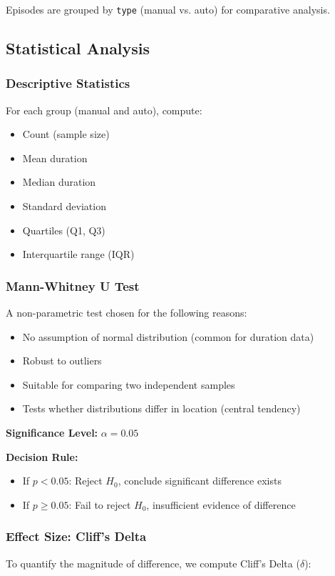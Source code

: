 \documentclass[12pt,a4paper]{article}
\begin{document}
Episodes are grouped by \texttt{type} (manual vs. auto) for comparative analysis.

\subsection{Statistical Analysis}

\subsubsection{Descriptive Statistics}
For each group (manual and auto), compute:
\begin{itemize}
    \item Count (sample size)
    \item Mean duration
    \item Median duration
    \item Standard deviation
    \item Quartiles (Q1, Q3)
    \item Interquartile range (IQR)
\end{itemize}

\subsubsection{Mann-Whitney U Test}
A non-parametric test chosen for the following reasons:
\begin{itemize}
    \item No assumption of normal distribution (common for duration data)
    \item Robust to outliers
    \item Suitable for comparing two independent samples
    \item Tests whether distributions differ in location (central tendency)
\end{itemize}

\textbf{Significance Level:} $\alpha = 0.05$

\textbf{Decision Rule:}
\begin{itemize}
    \item If $p < 0.05$: Reject $H_0$, conclude significant difference exists
    \item If $p \geq 0.05$: Fail to reject $H_0$, insufficient evidence of difference
\end{itemize}

\subsubsection{Effect Size: Cliff's Delta}
To quantify the magnitude of difference, we compute Cliff's Delta ($\delta$):
\end{document}
